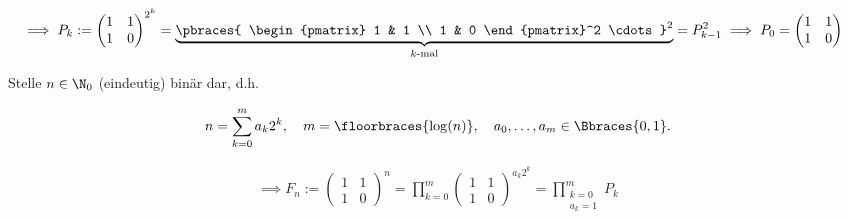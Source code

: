 \begin{solution}
\begin{enumerate}[label = \alph*.]
  \begin{align*}
    & \implies
    P_k
    :=
    \begin{pmatrix}
      1 & 1 \\
      1 & 0
    \end{pmatrix}^{2^k}
    =
    \underbrace
    {
      \pbraces
      {
        \begin{pmatrix}
          1 & 1 \\
          1 & 0
        \end{pmatrix}^2
        \cdots
      }^2
    }_{
      k \text{-mal}
    }
    =
    P_{k-1}^2
    \implies
    P_0
    =
    \begin{pmatrix}
      1 & 1 \\
      1 & 0
    \end{pmatrix}
  \end{align*}

  Stelle $n \in \N_0$ (eindeutig) binär dar, d.h.

  \begin{align*}
    n = \sum_{k=0}^m a_k 2^k,
    \quad
    m = \floorbraces{\log(n)},
    \quad
    a_0, \dots, a_m \in \Bbraces{0, 1}.
  \end{align*}

  \begin{align*}
    \implies
    F_n
    :=
    \begin{pmatrix}
      1 & 1 \\
      1 & 0
    \end{pmatrix}^n
    =
    \prod_{k=0}^m
    \begin{pmatrix}
      1 & 1 \\
      1 & 0
    \end{pmatrix}^{a_k 2^k}
    =
    \prod_{
      \substack
      {
        k = 0 \\
        a_k = 1
      }
    }^m
    P_k
  \end{align*}


\end{enumerate}
\end{solution}
